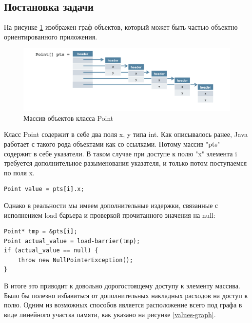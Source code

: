 \subsection{Постановка задачи}
На рисунке \ref{ref-graph}  изображен граф объектов, который может быть частью объектно-ориентированного приложения.
\begin{figure}[h]
	\caption{Массив объектов класса Point}\label{ref-graph}
	\includegraphics[width=0.95\linewidth]{image/reference.png}
\end{figure}
Класс Point содержит в себе два поля x, y типа int. Как описывалось ранее, Java работает с 
такого рода объектами как со ссылками. Потому массив "pts" содержит в себе указатели. В таком случае при доступе к полю "x" элемента i требуется дополнительное разыменования указателя, и только потом поступаемся по поля x.

\begin{lstlisting}
Point value = pts[i].x;
\end{lstlisting}
Однако в реальности мы имеем дополнительные издержки, связанные с исполнением load барьера и проверкой прочитанного значения на null:
\begin{lstlisting}
Point* tmp = &pts[i];
Point actual_value = load-barrier(tmp);
if (actual_value == null) {
	throw new NullPointerException();
}
\end{lstlisting}
В итоге это приводит к довольно дорогостоящему доступу к элементу массива. Было бы полезно избавиться от дополнительных накладных расходов на доступ к полю. Одним из возможных способов является расположение всего под графа в виде линейного участка памяти, как указано на рисунке \ref{values-graph}.

